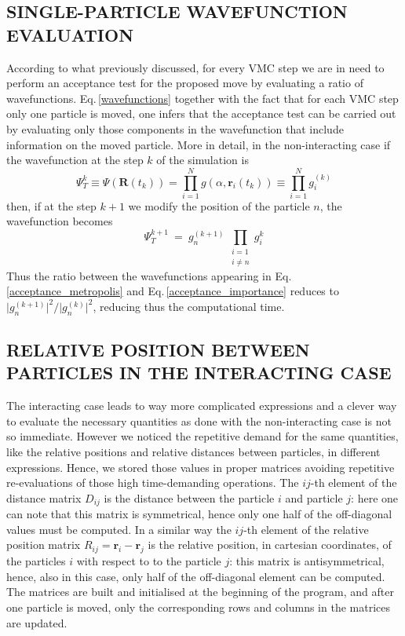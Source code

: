 \subsection{SINGLE-PARTICLE WAVEFUNCTION EVALUATION}
According to what previously discussed, for every VMC step we are in need to perform an acceptance test for the proposed move by evaluating a ratio of wavefunctions. Eq.\,\ref{wavefunctions} together with the fact that for each VMC step only one particle is moved, one infers that the acceptance test can be carried out by evaluating only those components in the wavefunction that include information on the moved particle. More in detail, in the non-interacting case if the wavefunction at the step $k$ of the simulation is
\begin{equation*}
    \Psi_T^{k} \equiv \Psi(\bm{R}(t_k)) = \prod_{i=1}^{N} g(\alpha, \bm{r}_i(t_k)) \equiv \prod_{i=1}^N g_i^{(k)}
\end{equation*}
then, if at the step $k+1$ we modify the position of the particle $n$, the wavefunction becomes
\begin{equation*}
    \Psi_T^{k+1} \ = \ g_n^{(k+1)} \, \prod_{\substack{i=1\\ i \neq n}} g_i^{k}
\end{equation*}
Thus the ratio between the wavefunctions appearing in Eq.\,\ref{acceptance_metropolis} and Eq.\,\ref{acceptance_importance} reduces to $\vert g_n^{(k+1)} \vert^2 / \vert g_n^{(k)} \vert^2$, reducing thus the computational time. 


\subsection{RELATIVE POSITION BETWEEN PARTICLES IN THE INTERACTING CASE}
The interacting case leads to way more complicated expressions and a clever way to evaluate the necessary quantities as done with the non-interacting case is not so immediate. However we noticed the repetitive demand for the same quantities, like the relative positions and relative distances between particles, in different expressions. Hence, we stored those values in proper matrices avoiding repetitive re-evaluations of those high time-demanding operations. The $ij$-th element of the distance matrix $D_{ij}$ is the distance between the particle $i$ and particle $j$: here one can note that this matrix is symmetrical, hence only one half of the off-diagonal values must be computed. In a similar way the $ij$-th element of the relative position matrix $R_{ij} = \bm{r}_i - \bm{r}_j$ is the relative position, in cartesian coordinates, of the particles $i$ with respect to to the particle $j$: this matrix is antisymmetrical, hence, also in this case, only half of the off-diagonal element can be computed. The matrices are built and initialised at the beginning of the program, and after one particle is moved, only the corresponding rows and columns in the matrices are updated.

